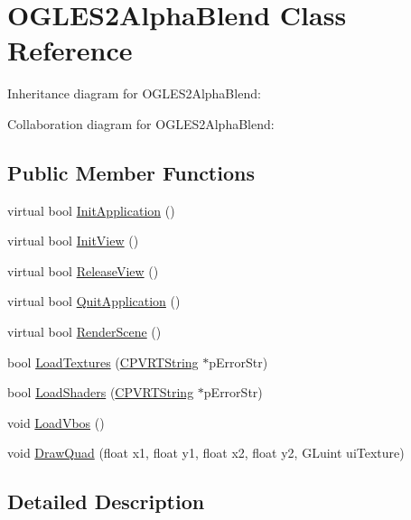 \hypertarget{class_o_g_l_e_s2_alpha_blend}{\section{O\+G\+L\+E\+S2\+Alpha\+Blend Class Reference}
\label{class_o_g_l_e_s2_alpha_blend}
}


Inheritance diagram for O\+G\+L\+E\+S2\+Alpha\+Blend\+:


Collaboration diagram for O\+G\+L\+E\+S2\+Alpha\+Blend\+:
\subsection*{Public Member Functions}
\begin{DoxyCompactItemize}
\item 
virtual bool \hyperlink{class_o_g_l_e_s2_alpha_blend_a2742bd10ae8ea83d0f2f618557bbb5f4}{Init\+Application} ()
\item 
virtual bool \hyperlink{class_o_g_l_e_s2_alpha_blend_ae12cde52d934d877320ada08767b7c23}{Init\+View} ()
\item 
virtual bool \hyperlink{class_o_g_l_e_s2_alpha_blend_a77fcfb1c3204a5e318b48914840cd1bc}{Release\+View} ()
\item 
virtual bool \hyperlink{class_o_g_l_e_s2_alpha_blend_ac873a8d817a005f4d9190a1ab2dc98c4}{Quit\+Application} ()
\item 
virtual bool \hyperlink{class_o_g_l_e_s2_alpha_blend_a8556ad801c1204bc2c407591773b5b41}{Render\+Scene} ()
\item 
bool \hyperlink{class_o_g_l_e_s2_alpha_blend_a3ed834079b625ae6d4d7ecc1ef18e73f}{Load\+Textures} (\hyperlink{class_c_p_v_r_t_string}{C\+P\+V\+R\+T\+String} $\ast$p\+Error\+Str)
\item 
bool \hyperlink{class_o_g_l_e_s2_alpha_blend_a7c2e5ccf9e1d38e34d0cceacfc020d76}{Load\+Shaders} (\hyperlink{class_c_p_v_r_t_string}{C\+P\+V\+R\+T\+String} $\ast$p\+Error\+Str)
\item 
void \hyperlink{class_o_g_l_e_s2_alpha_blend_a41fb4c519d6741f8b94588d2b2d74d61}{Load\+Vbos} ()
\item 
void \hyperlink{class_o_g_l_e_s2_alpha_blend_adeb191abca3ec5571a8223d8715a0328}{Draw\+Quad} (float x1, float y1, float x2, float y2, G\+Luint ui\+Texture)
\end{DoxyCompactItemize}


\subsection{Detailed Description}


